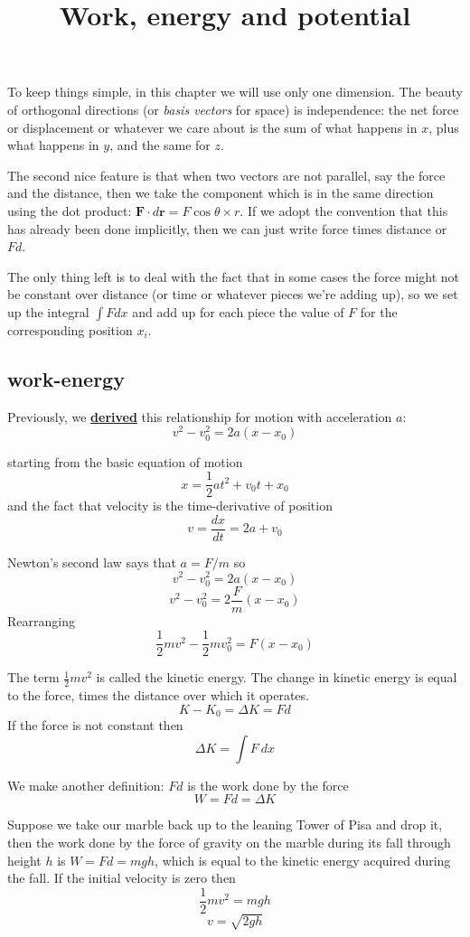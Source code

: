 \documentclass[11pt, oneside]{article}
\title{Work, energy and potential}
\date{}
\begin{document}
\maketitle
\Large
To keep things simple, in this chapter we will use only one dimension.  The beauty of orthogonal directions (or \emph{basis vectors} for space) is independence:  the net force or displacement or whatever we care about is the sum of what happens in $x$, plus what happens in $y$, and the same for $z$.

The second nice feature is that when two vectors are not parallel, say the force and the distance, then we take the component which is in the same direction using the dot product:  $\mathbf{F} \cdot d \mathbf{r} = F \cos \theta \times r$.  If we adopt the convention that this has already been done implicitly, then we can just write force times distance or $Fd$.

The only thing left is to deal with the fact that in some cases the force might not be constant over distance (or time or whatever pieces we're adding up), so we set up the integral $\int F dx$ and add up for each piece the value of $F$ for the corresponding position $x_i$.

\subsection*{work-energy}

Previously, we \label{sec:Gravity}\hyperref[sec:Falling_bodies]{\textbf{derived}} this relationship for motion with acceleration $a$:
\[ v^2 - v_0^2 = 2a (x - x_0) \]

starting from the basic equation of motion
\[ x = \frac{1}{2}at^2 + v_0t + x_0 \]
and the fact that velocity is the time-derivative of position
\[ v = \frac{dx}{dt} = 2a + v_0 \]

Newton's second law says that $a = F/m$ so
\[ v^2 - v_0^2 = 2a (x - x_0) \]
\[ v^2 - v_0^2 = 2\frac{F}{m} (x - x_0) \]
Rearranging
\[ \frac{1}{2}mv^2 -  \frac{1}{2}mv_0^2 = F (x - x_0) \]

The term $\frac{1}{2} mv^2$ is called the kinetic energy.  The change in kinetic energy is equal to the force, times the distance over which it operates.
\[ K - K_0 = \Delta K = Fd \]
If the force is not constant then
\[ \Delta K = \int F \ dx \]

We make another definition:  $Fd$ is the work done by the force
\[ W = Fd = \Delta K \]

Suppose we take our marble back up to the leaning Tower of Pisa and drop it, then the work done by the force of gravity on the marble during its fall through height $h$ is $W = Fd = mgh$, which is equal to the kinetic energy acquired during the fall.  If the initial velocity is zero then
\[ \frac{1}{2} mv^2 = mgh \]
\[ v = \sqrt{2gh} \]
\end{document}

